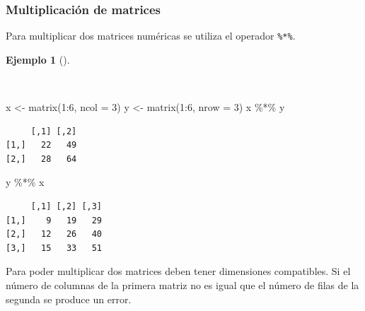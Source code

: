 \documentclass[
  spanish,
  a4paper,
]{scrreport}
\newenvironment{Shaded}{\begin{snugshade}}{\end{snugshade}}
\newcommand{\AttributeTok}[1]{\textcolor[rgb]{0.40,0.45,0.13}{#1}}
\newcommand{\DecValTok}[1]{\textcolor[rgb]{0.68,0.00,0.00}{#1}}
\newcommand{\FunctionTok}[1]{\textcolor[rgb]{0.28,0.35,0.67}{#1}}
\newcommand{\NormalTok}[1]{\textcolor[rgb]{0.00,0.23,0.31}{#1}}
\newcommand{\OtherTok}[1]{\textcolor[rgb]{0.00,0.23,0.31}{#1}}
\newcommand{\SpecialCharTok}[1]{\textcolor[rgb]{0.37,0.37,0.37}{#1}}
\theoremstyle{definition}
\theoremstyle{definition}
\newtheorem{example}{Ejemplo}[chapter]
\theoremstyle{remark}
\begin{document}
\subsubsection{Multiplicación de
matrices}\label{multiplicaciuxf3n-de-matrices}

Para multiplicar dos matrices numéricas se utiliza el operador
\texttt{\%*\%}.

\begin{example}[]\protect\hypertarget{exm-producto-matrices}{}\label{exm-producto-matrices}

~

\begin{Shaded}
\begin{Highlighting}[]
\NormalTok{x }\OtherTok{\textless{}{-}} \FunctionTok{matrix}\NormalTok{(}\DecValTok{1}\SpecialCharTok{:}\DecValTok{6}\NormalTok{, }\AttributeTok{ncol =} \DecValTok{3}\NormalTok{)}
\NormalTok{y }\OtherTok{\textless{}{-}} \FunctionTok{matrix}\NormalTok{(}\DecValTok{1}\SpecialCharTok{:}\DecValTok{6}\NormalTok{, }\AttributeTok{nrow =} \DecValTok{3}\NormalTok{)}
\NormalTok{x }\SpecialCharTok{\%*\%}\NormalTok{ y}
\end{Highlighting}
\end{Shaded}

\begin{verbatim}
     [,1] [,2]
[1,]   22   49
[2,]   28   64
\end{verbatim}

\begin{Shaded}
\begin{Highlighting}[]
\NormalTok{y }\SpecialCharTok{\%*\%}\NormalTok{ x}
\end{Highlighting}
\end{Shaded}

\begin{verbatim}
     [,1] [,2] [,3]
[1,]    9   19   29
[2,]   12   26   40
[3,]   15   33   51
\end{verbatim}

\end{example}

\begin{tcolorbox}[enhanced jigsaw, arc=.35mm, bottomrule=.15mm, bottomtitle=1mm, breakable, colback=white, colbacktitle=quarto-callout-warning-color!10!white, colframe=quarto-callout-warning-color-frame, coltitle=black, left=2mm, leftrule=.75mm, opacityback=0, opacitybacktitle=0.6, rightrule=.15mm, title=\textcolor{quarto-callout-warning-color}{\faExclamationTriangle}\hspace{0.5em}{Advertencia}, titlerule=0mm, toprule=.15mm, toptitle=1mm]

Para poder multiplicar dos matrices deben tener dimensiones compatibles.
Si el número de columnas de la primera matriz no es igual que el número
de filas de la segunda se produce un error.

\end{tcolorbox}
\end{document}
